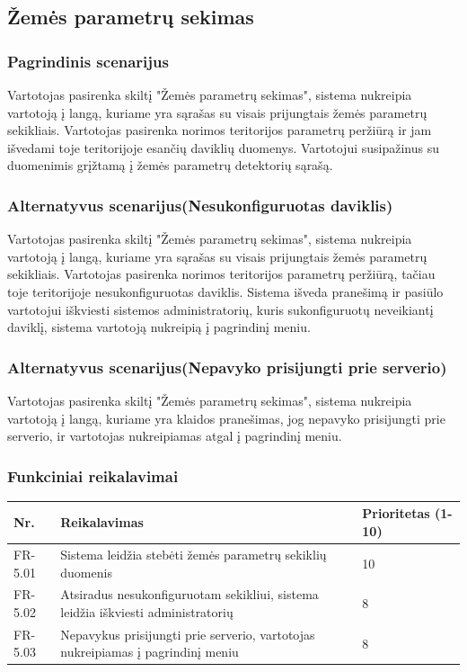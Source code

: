 \documentclass[oneside]{VUMIFPSkursinis}
\begin{document}
\subsection{Žemės parametrų sekimas}
\subsubsection{Pagrindinis scenarijus}
	Vartotojas pasirenka skiltį "Žemės parametrų sekimas", sistema nukreipia vartotoją į langą, kuriame yra sąrašas su visais prijungtais žemės parametrų sekikliais. Vartotojas pasirenka norimos teritorijos parametrų peržiūrą ir jam išvedami toje teritorijoje esančių daviklių duomenys. Vartotojui susipažinus su duomenimis grįžtamą į žemės parametrų detektorių sąrašą.
\subsubsection{Alternatyvus scenarijus(Nesukonfiguruotas daviklis)}
	Vartotojas pasirenka skiltį "Žemės parametrų sekimas", sistema nukreipia vartotoją į langą, kuriame yra sąrašas su visais prijungtais žemės parametrų sekikliais. Vartotojas pasirenka norimos teritorijos parametrų peržiūrą, tačiau toje teritorijoje nesukonfiguruotas daviklis. Sistema išveda pranešimą ir pasiūlo vartotojui iškviesti sistemos administratorių, kuris sukonfiguruotų neveikiantį daviklį, sistema vartotoją nukreipią į pagrindinį meniu.
\subsubsection{Alternatyvus scenarijus(Nepavyko prisijungti prie serverio)}
	Vartotojas pasirenka skiltį "Žemės parametrų sekimas", sistema nukreipia vartotoją į langą, kuriame yra klaidos pranešimas, jog nepavyko prisijungti prie serverio, ir vartotojas nukreipiamas atgal į pagrindinį meniu.
\subsubsection{Funkciniai reikalavimai}
\begin{table}[htbp]
	\begin{tabularx}{1\textwidth}{ |P{2.5cm}|X|P{3cm }| }  \hline
    Nr. & Reikalavimas &  Prioritetas (1-10)  \\   \hline 
    FR-5.01 & Sistema leidžia stebėti žemės parametrų sekiklių duomenis & 10  \\   \hline
		FR-5.02 & Atsiradus nesukonfiguruotam sekikliui, sistema leidžia iškviesti administratorių & 8 \\  \hline
		FR-5.03 & Nepavykus prisijungti prie serverio, vartotojas nukreipiamas į pagrindinį meniu & 8 \\ \hline
	\end{tabularx}
\end{table}
\end{document}
